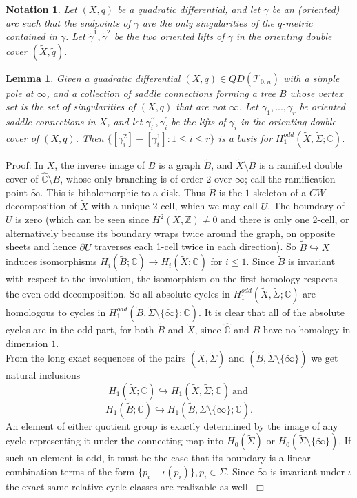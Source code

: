 \documentclass[12pt]{article}
\newtheorem{lemma}[theorem]{Lemma}
\newtheorem{notation}[theorem]{Notation}
\newcommand{\zz}{\mathbb{Z}}
\newcommand{\cc}{\mathbb{C}}
\begin{document}
\begin{notation}Let $(X,q)$ be a quadratic differential, and let $\gamma$ be an (oriented) arc such that the endpoints of $\gamma$ are the only singularities of the $q$-metric contained in $\gamma$. Let $\tilde{\gamma}^1,\tilde{\gamma}^2$ be the two oriented lifts of $\gamma$ in the orienting double cover $(\tilde{X},\tilde{q}).$\end{notation}

\begin{lemma}Given a quadratic differential $(X,q) \in QD(\mathcal{T}_{0,n})$ with a simple pole at $\infty$, and a collection of saddle connections forming a tree $B$ whose vertex set is the set of singularities of $(X,q)$ that are not $\infty$. Let $\gamma_1,...,\gamma_r$ be oriented saddle connections in $X$, and let $\gamma_i^{\prime\prime},\gamma_i^\prime$ be the lifts of $\gamma_i$ in the orienting double cover of $(X,q)$. Then $\{[\gamma_i^{2}] - [\gamma_i^1]: 1 \leq i \leq r\}$ is a basis for $H_1^{odd}(\tilde{X},\tilde{\Sigma}; \cc)$. \end{lemma}

\noindent Proof: In $\tilde{X}$, the inverse image of $B$ is a graph $\tilde{B}$, and $\tilde{X} \setminus \tilde{B}$ is a ramified double cover of $\hat{\cc} \setminus B$, whose only branching is of order 2 over $\infty$; call the ramification point $\tilde{\infty}$. This is biholomorphic to a disk. Thus $\tilde{B}$ is the $1$-skeleton of a $CW$ decomposition of $\tilde{X}$ with a unique 2-cell, which we may call $U$. The boundary of $U$ is zero (which can be seen since $H^2(X,\zz) \neq 0$ and there is only one 2-cell, or alternatively because its boundary wraps twice around the graph, on opposite sheets and hence $\partial U$ traverses each 1-cell twice in each direction). So $\tilde{B} \hookrightarrow X$ induces isomorphisms $H_i(\tilde{B};\cc) \to H_i(\tilde{X};\cc)$ for $i \leq 1$. Since $\tilde{B}$ is invariant with respect to the involution, the isomorphism on the first homology respects the even-odd decomposition. So all absolute cycles in $H_1^{odd}(\tilde{X},\tilde{\Sigma};\cc)$ are homologous to cycles in $H_1^{odd}(\tilde{B},\tilde{\Sigma} \setminus \{\tilde{\infty}\};\cc)$. It is clear that all of the absolute cycles are in the odd part, for both $\tilde{B}$ and $\tilde{X}$, since $\hat{\cc}$ and $B$ have no homology in dimension $1$.\\

\noindent From the long exact sequences of the pairs $(\tilde{X},\tilde{\Sigma})$ and $(\tilde{B},\tilde{\Sigma} \setminus \{\tilde{\infty}\})$ we get natural inclusions $$H_1(\tilde{X};\cc) \hookrightarrow H_1(\tilde{X},\tilde{\Sigma};\cc) \mathrm{~and~}$$ $$H_1(\tilde{B};\cc) \hookrightarrow H_1(\tilde{B},\Sigma \setminus \{\tilde{\infty}\};\cc).$$ An element of either quotient group is exactly determined by the image of any cycle representing it under the connecting map into $H_0(\tilde{\Sigma})$ or $H_0(\tilde{\Sigma} \setminus \{\tilde{\infty}\})$. If such an element is odd, it must be the case that its boundary is a linear combination terms of the form $\{p_i - \iota(p_i)\}, p_i \in \Sigma.$ Since $\tilde{\infty}$ is invariant under $\iota$ the exact same relative cycle classes are realizable as well. $\Box$
\end{document}
